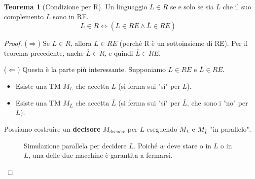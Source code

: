 \documentclass[a4paper]{article}
\theoremstyle{definition} %
\newtheorem{theorem}{Teorema}
\theoremstyle{remark} %
\begin{document}
\begin{theorem}[Condizione per R]
Un linguaggio $L \in R$ se e solo se sia $L$ che il suo complemento $\overline{L}$ sono in RE.
\[ L \in R \iff (L \in RE \land \overline{L} \in RE) \]
\end{theorem}
\begin{proof}
($\Rightarrow$) Se $L \in R$, allora $L \in RE$ (perché R è un sottoinsieme di RE). Per il teorema precedente, anche $\overline{L} \in R$, e quindi $\overline{L} \in RE$.

($\Leftarrow$) Questa è la parte più interessante. Supponiamo $L \in RE$ e $\overline{L} \in RE$.
\begin{itemize}
    \item Esiste una TM $M_L$ che accetta $L$ (si ferma sui "sì" per $L$).
    \item Esiste una TM $M_{\overline{L}}$ che accetta $\overline{L}$ (si ferma sui "sì" per $\overline{L}$, che sono i "no" per $L$).
\end{itemize}
Possiamo costruire un \textbf{decisore} $M_{decider}$ per $L$ eseguendo $M_L$ e $M_{\overline{L}}$ "in parallelo".

\begin{figure}[h!]
\centering
{}
\caption{Simulazione parallela per decidere $L$. Poiché $w$ deve stare o in $L$ o in $\overline{L}$, una delle due macchine è garantita a fermarsi.}
\label{fig:parallel}
\end{figure}


\end{proof}
\end{document}
